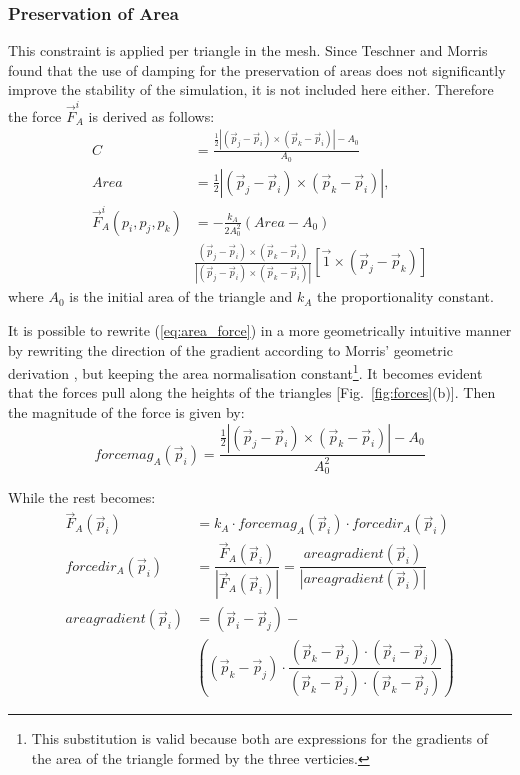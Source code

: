 \documentclass[journal]{IEEEtran}
\newcommand{\eref}[1]{(\ref{#1})}
\newcommand{\fref}[1]{Fig.~\ref{#1}}
\newcommand{\comment}[1]{{\color{red} #1}}
\begin{document}
\subsubsection{Preservation of Area}
This constraint is applied per triangle in the mesh.  Since Teschner and Morris \comment{%
found that the use of damping for the preservation of areas does not significantly improve the stability of the simulation, it is not included here either.}  Therefore the force $\vec{F}^i_A$ is derived as follows:
\begin{align}
 C &= \frac{\frac{1}{2}|(\vec{p}_j-\vec{p}_i)\times(\vec{p}_k-\vec{p}_i)|-A_0}{A_0} \\
 Area &= \frac{1}{2}|(\vec{p}_j-\vec{p}_i)\times(\vec{p}_k-\vec{p}_i)|, \\
 \vec{F}^i_A(p_i,p_j,p_k) &= -\frac{k_A}{2A_0^2} \left( Area-A_0 \right) \nonumber \\
 & \frac{(\vec{p}_j-\vec{p}_i)\times(\vec{p}_k-\vec{p}_i)}{|(\vec{p}_j-\vec{p}_i)\times(\vec{p}_k-\vec{p}_i)|} [\vec{1} \times (\vec{p}_j-\vec{p}_k)] \label{eq:area_force}
\end{align}
where $A_0$ is the initial area of the triangle and $k_A$ the proportionality constant.

It is possible to rewrite \eref{eq:area_force} in a more geometrically intuitive manner by rewriting the direction of the gradient according to Morris' geometric derivation \cite{Morris2008}, but keeping the area normalisation constant\footnote{This substitution is valid because both are expressions for the gradients of the area of the triangle formed by the three verticies.}.  It becomes evident that the forces pull along the heights of the triangles [\fref{fig:forces}(b)].  Then the magnitude of the force is given by:
\begin{equation}
 forcemag_A(\vec{p}_i)= \frac{\frac{1}{2}|(\vec{p}_j-\vec{p}_i)\times(\vec{p}_k-\vec{p}_i)|-A_0}{A_0^2}
\end{equation}

While the rest becomes:
\begin{align}
 \vec{F}_A(\vec{p}_i) & = k_A \cdot forcemag_A(\vec{p}_i) \cdot forcedir_A(\vec{p}_i) \nonumber \\
 forcedir_A(\vec{p}_i) & = \dfrac{\vec{F}_A(\vec{p}_i)}{|\vec{F}_A(\vec{p}_i)|} = \dfrac{areagradient(\vec{p}_i)}{|areagradient(\vec{p}_i)|} \nonumber \\
 areagradient(\vec{p}_i) & = (\vec{p}_i-\vec{p}_j)- \nonumber \\
 & \left( (\vec{p}_k-\vec{p}_j) \cdot \dfrac{(\vec{p}_k-\vec{p}_j) \cdot (\vec{p}_i-\vec{p}_j)}{(\vec{p}_k-\vec{p}_j) \cdot (\vec{p}_k-\vec{p}_j)} \right)
\end{align}
\end{document}
